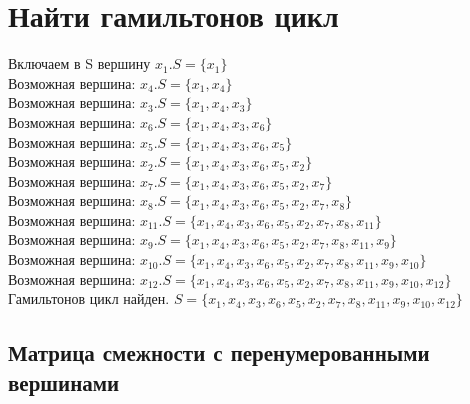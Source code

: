 \documentclass[12pt,a4paper]{report}
\begin{document}
\section*{Найти гамильтонов цикл}
Включаем в S вершину $x_1. S = \{x_1\}$\\
Возможная вершина: $x_{4}. S = \{x_{1},x_{4}\}$\\
Возможная вершина: $x_{3}. S = \{x_{1},x_{4},x_{3}\}$\\
Возможная вершина: $x_{6}. S = \{x_{1},x_{4},x_{3},x_{6}\}$\\
Возможная вершина: $x_{5}. S = \{x_{1},x_{4},x_{3},x_{6},x_{5}\}$\\
Возможная вершина: $x_{2}. S = \{x_{1},x_{4},x_{3},x_{6},x_{5},x_{2}\}$\\
Возможная вершина: $x_{7}. S = \{x_{1},x_{4},x_{3},x_{6},x_{5},x_{2},x_{7}\}$\\
Возможная вершина: $x_{8}. S = \{x_{1},x_{4},x_{3},x_{6},x_{5},x_{2},x_{7},x_{8}\}$\\
Возможная вершина: $x_{11}. S = \{x_{1},x_{4},x_{3},x_{6},x_{5},x_{2},x_{7},x_{8},x_{11}\}$\\
Возможная вершина: $x_{9}. S = \{x_{1},x_{4},x_{3},x_{6},x_{5},x_{2},x_{7},x_{8},x_{11},x_{9}\}$\\
Возможная вершина: $x_{10}. S = \{x_{1},x_{4},x_{3},x_{6},x_{5},x_{2},x_{7},x_{8},x_{11},x_{9},x_{10}\}$\\
Возможная вершина: $x_{12}. S = \{x_{1},x_{4},x_{3},x_{6},x_{5},x_{2},x_{7},x_{8},x_{11},x_{9},x_{10},x_{12}\}$\\
Гамильтонов цикл найден. $S = \{x_{1},x_{4},x_{3},x_{6},x_{5},x_{2},x_{7},x_{8},x_{11},x_{9},x_{10},x_{12}\}$\\



\subsection*{Матрица смежности с перенумерованными вершинами}
\end{document}

